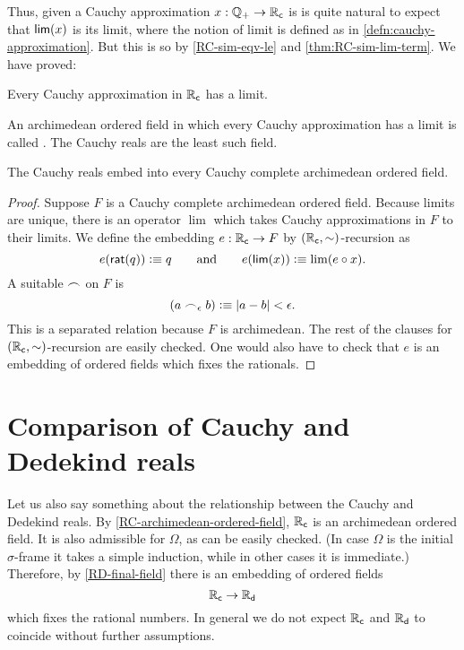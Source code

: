 Thus, given a Cauchy approximation $x : \mathbb{Q}_{+} \to \mathbb{R}_\mathsf{c}$ is is quite natural to expect that
$\mathsf{lim}(x)$ is its limit, where the notion of limit is defined as in
\autoref{defn:cauchy-approximation}. But this is so by \autoref{RC-sim-eqv-le} and
\autoref{thm:RC-sim-lim-term}. We have proved:

\begin{thm}
  Every Cauchy approximation in $\mathbb{R}_\mathsf{c}$ has a limit.
\end{thm}

An archimedean ordered field in which every Cauchy approximation has a limit is called
. The Cauchy reals are the least such field.

\begin{thm} \label{RC-initial-Cauchy-complete}
  The Cauchy reals embed into every Cauchy complete archimedean ordered field.
\end{thm}

\begin{proof}
  Suppose $F$ is a Cauchy complete archimedean ordered field. Because limits are unique,
  there is an operator $\lim$ which takes Cauchy approximations in $F$ to their limits. We
  define the embedding $e : \mathbb{R}_\mathsf{c} \to F$ by $(\mathbb{R}_\mathsf{c}, {\mathord\sim})$-recursion as
  \begin{equation*}
    e(\mathsf{rat}(q)) \vcentcolon\equiv q
    \qquad\text{and}\qquad
    e(\mathsf{lim}(x)) \vcentcolon\equiv \lim (e \circ x).
  \end{equation*}
  A suitable $\frown$ on $F$ is
  \begin{equation*}
    (a \frown_\epsilon b) \vcentcolon\equiv |a - b| < \epsilon.
  \end{equation*}
  This is a separated relation because $F$ is archimedean. The rest of the clauses for
  $(\mathbb{R}_\mathsf{c}, {\mathord\sim})$-recursion are easily checked. One would also have to check that $e$ is
  an embedding of ordered fields which fixes the rationals.
\end{proof}


\section{Comparison of Cauchy and Dedekind reals}
\label{sec:comp-cauchy-dedek}

Let us also say something about the relationship between the Cauchy and Dedekind reals. By
\autoref{RC-archimedean-ordered-field}, $\mathbb{R}_\mathsf{c}$ is an archimedean ordered field. It is also
admissible for $\Omega$, as can be easily checked. (In case $\Omega$ is the initial
$\sigma$-frame it takes a simple induction, while in other cases it is immediate.)
Therefore, by \autoref{RD-final-field} there is an embedding of ordered fields
%
\begin{equation*}
  \mathbb{R}_\mathsf{c} \to \mathbb{R}_\mathsf{d}
\end{equation*}
%
which fixes the rational numbers. In general we do not expect $\mathbb{R}_\mathsf{c}$ and $\mathbb{R}_\mathsf{d}$ to coincide
without further assumptions. 

